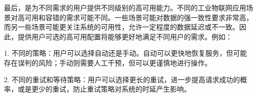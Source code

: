 最后，是为不同需求的用户提供不同级别的高可用能力。不同的工业物联网应用场景对高可用和容错的需求可能不同。一些场景可能对数据的强一致性要求非常高，而另一些场景可能更关注系统的可用性，允许一定程度的数据延迟或不一致。因此，提供用户可选的高可用配置将能够更好地满足不同用户的需求。例如：

1. 不同的\failover 策略：用户可以选择自动\failover 还是手动\failover 。自动\failover 可以更快地恢复服务，但可能存在误判的风险；手动\failover 则需要人工干预，但可以更谨慎地进行操作。

2. 不同的重试和等待策略：用户可以选择更长的重试，进一步提高请求成功的概率，或是更少的重试，防止重试策略对系统的时延产生影响。